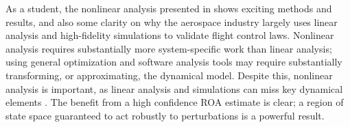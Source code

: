 \documentclass[%
 reprint,
 amsmath,amssymb,
 aps,
]{revtex4-2}
\begin{document}
As a student, the nonlinear analysis presented in \cite{primary} shows exciting methods and results, and also some clarity on why the aerospace industry largely uses linear analysis and high-fidelity simulations to validate flight control laws. Nonlinear analysis requires substantially more system-specific work than linear analysis; using general optimization and software analysis tools may require substantially transforming, or approximating, the dynamical model. Despite this, nonlinear analysis is important, as linear analysis and simulations can miss key dynamical elements \cite{primary}\cite{leaf}. The benefit from a high confidence ROA estimate is clear; a region of state space guaranteed to act robustly to perturbations is a powerful result.

\nocite{*}

\end{document}

